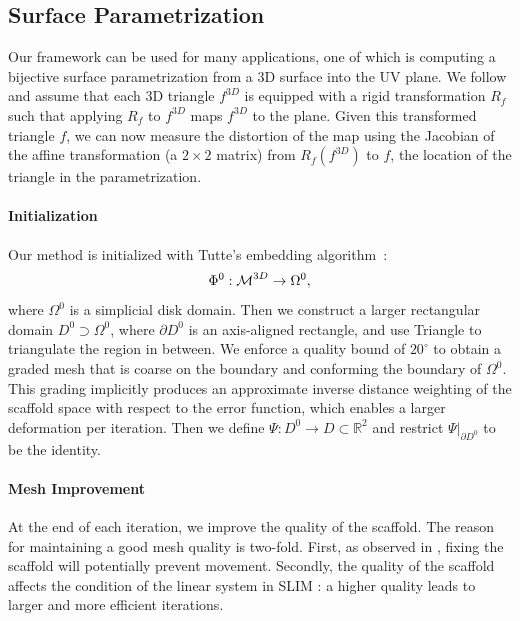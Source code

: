\subsection{Surface Parametrization}
Our framework can be used for many applications, one of which is computing a bijective surface parametrization from a 3D surface into the UV  plane. We follow \cite{Liu:2008} and assume that each 3D triangle $f^{3D}$ is equipped with a rigid transformation $R_f$ such that applying $R_f$ to $f^{3D}$ maps $f^{3D}$ to the plane. Given this transformed triangle $f$, we can now measure the distortion of the map using the Jacobian of the affine transformation (a $2\times2$ matrix) from $R_f(f^{3D})$ to $f$, the location of the triangle in the parametrization.

\paragraph{Initialization} Our method is initialized with Tutte's embedding algorithm~\cite{Tutte:1963}:
\[\Phi^0 : \operatorname{\mathcal{M}}^{3D} \rightarrow \Omega^0,\]
where $\Omega^0$ is a simplicial disk domain. Then we construct a larger rectangular domain $D^0 \supset \Omega^0$, where $\partial D^0$ is an axis-aligned rectangle, and use Triangle \cite{Shewchuk:1996} to triangulate the region in between.  We enforce a quality bound of $20^\circ$ to obtain a graded mesh that is coarse on the boundary and conforming the boundary of $\Omega^0$. This grading implicitly produces an approximate inverse distance  weighting of the scaffold space with respect to the error function, which enables a larger deformation per iteration. Then we define $\Psi: D^0 \rightarrow D \subset \mathbb{R}^{2}$ and restrict $\Psi |_{\partial D^0}$ to be the identity.

\paragraph{Mesh Improvement}
At the end of each iteration, we improve the quality of the scaffold. The reason for maintaining a good mesh quality is two-fold. 
First, as observed in \cite{Zhang:2005, Muller:2015}, fixing the scaffold will potentially prevent movement. Secondly, the quality of the scaffold affects the condition of the linear system in SLIM \cite{rabinovich2017scalable}: a higher  quality leads to larger and more efficient iterations.

